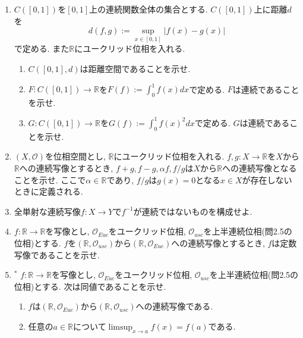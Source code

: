 \documentclass[dvipdfmx,a4paper,11pt]{article}
\newcommand{\R}{\mathbb{R}}
\theoremstyle{definition}
\begin{document}
\begin{enumerate}[ label=\textbf{問}3.\arabic*]
\item $C([0,1])$を$[0,1]$上の連続関数全体の集合とする. $C([0,1])$上に距離$d$を
$$
d(f,g) := \sup_{x \in [0,1]} | f(x) - g(x)|
$$
で定める. また$\R$にユークリッド位相を入れる.
	\begin{enumerate}
	\item $C([0,1], d)$は距離空間であることを示せ.
	\item $F : C([0,1]) \rightarrow \R$を$F(f) := \int_{0}^{1} f(x) dx$で定める. $F$は連続であることを示せ.
	\item $G : C([0,1]) \rightarrow \R$を$G(f) := \int_{0}^{1} f(x)^2 dx$で定める. $G$は連続であることを示せ.
	\end{enumerate}

\item $(X, \mathscr{O})$を位相空間とし, $\R$にユークリッド位相を入れる. $f,g :  X \rightarrow \R$を$X$から$\R$への連続写像とするとき, $f +g, f-g, \alpha f, f/g$は$X$から$\R$への連続写像となることを示せ. ここで$\alpha \in \R$であり, $f/g$は$g(x)=0$となる$x \in X$が存在しないときに定義される. 



 \item 全単射な連続写像$f :  X \rightarrow Y$で$f^{-1}$が連続ではないものを構成せよ. 
 
	

\item $f : \R \rightarrow \R$を写像とし, $\mathscr{O}_{Euc}$をユークリッド位相, $\mathscr{O}_{usc}$を上半連続位相(問2.5の位相)とする. $f$を$(\R, \mathscr{O}_{usc})$から$(\R, \mathscr{O}_{Euc})$への連続写像とするとき, $f$は定数写像であることを示せ.

\item $^*$ $f : \R \rightarrow \R$を写像とし, $\mathscr{O}_{Euc}$をユークリッド位相, $\mathscr{O}_{usc}$を上半連続位相(問2.5の位相)とする. 次は同値であることを示せ.
	\begin{enumerate}
	\item $f$は$(\R, \mathscr{O}_{Euc})$から$(\R, \mathscr{O}_{usc})$への連続写像である.
	\item 任意の$a \in \R$について$\limsup_{x \rightarrow a} f(x) =f(a)$である.
	\end{enumerate}
 

\end{enumerate}
\end{document}
